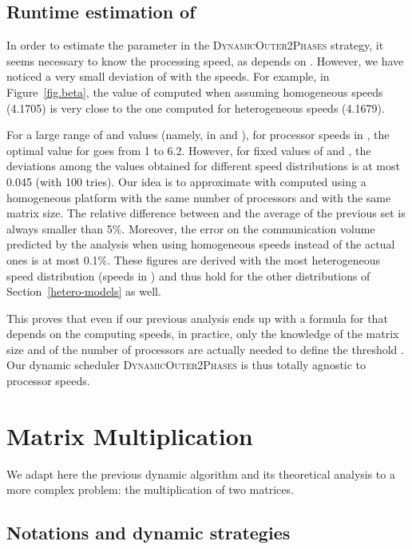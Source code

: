 \documentclass[a4paper,10pt]{article}
\newcommand{\stupidthreshold}{\textsc{Dynamic\-Outer\-2Phases}\xspace}
\begin{document}
\subsection{Runtime estimation of }
\label{betaestimation}

In order to estimate the  parameter in the \stupidthreshold
strategy, it seems necessary to know the processing speed, as 
depends on . However, we have
noticed a very small deviation of  with the speeds. For
example, in Figure~\ref{fig.beta}, the value of  computed when
assuming homogeneous speeds (4.1705) is very close to the one computed
for heterogeneous speeds (4.1679). 

For a large range of  and  values (namely,  in 
and ), for processor speeds in
, the optimal value for  goes from 1 to 6.2. However,
for fixed values of  and , the deviations among the 
values obtained for different speed distributions is at most 0.045
(with 100 tries).  Our idea is to approximate  with
 computed using a homogeneous platform with the
same number of processors and with the same matrix size. The relative
difference between  and the average  of
the previous set is always smaller than 5\%. Moreover, the error on
the communication volume predicted by the analysis when using
homogeneous speeds instead of the actual ones is at most 0.1\%. These
figures are derived with the most heterogeneous speed distribution
(speeds in ) and thus hold for the other distributions of
Section~\ref{hetero-models} as well.

This proves that even if our previous analysis ends up with a formula
for  that depends on the computing speeds, in practice, only
the knowledge of the matrix size and of the number of processors are
actually needed to define the threshold . Our dynamic scheduler
\stupidthreshold is thus totally agnostic to processor speeds.


\section{Matrix Multiplication}
\label{matrix_mult}

We adapt here the previous dynamic algorithm and its theoretical
analysis to a more complex problem: the multiplication of two
matrices.



\subsection{Notations and dynamic strategies}
\end{document}
